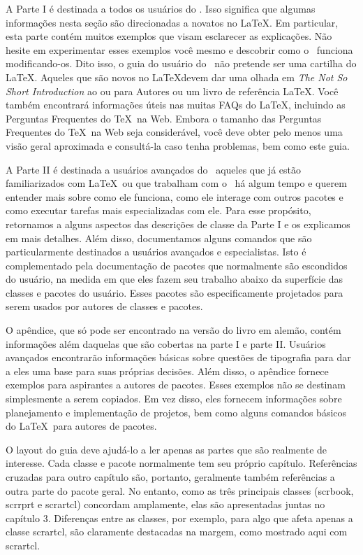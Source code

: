 A Parte I é destinada a todos os usuários do \KOMAScript. Isso significa que algumas informações nesta seção são direcionadas a novatos no \LaTeX. Em particular, esta parte contém muitos exemplos que visam esclarecer as explicações. Não hesite em experimentar esses exemplos você mesmo e descobrir como o \KOMAScript\ funciona modificando-os. Dito isso, o guia do usuário do \KOMAScript\ não pretende ser uma cartilha do \LaTeX. Aqueles que são novos no \LaTeX devem dar uma olhada em \textit{The Not So Short Introduction} ao \LaTeXe ou \LaTeXe para Autores ou um livro de referência \LaTeX. Você também encontrará informações úteis nas muitas FAQs do \LaTeX, incluindo as Perguntas Frequentes do \TeX\ na Web. Embora o tamanho das Perguntas Frequentes do \TeX\ na Web seja considerável, você deve obter pelo menos uma visão geral aproximada e consultá-la caso tenha problemas, bem como este guia.

A Parte II é destinada a usuários avançados do \KOMAScript\, aqueles que já estão familiarizados com \LaTeX\ ou que trabalham com o \KOMAScript\ há algum tempo e querem entender mais sobre como ele funciona, como ele interage com outros pacotes e como executar tarefas mais especializadas com ele. Para esse propósito, retornamos a alguns aspectos das descrições de classe da Parte I e os explicamos em mais detalhes. Além disso, documentamos alguns comandos que são particularmente destinados a usuários avançados e especialistas. Isto é complementado pela documentação de pacotes que normalmente são escondidos do usuário, na medida em que eles fazem seu trabalho abaixo da superfície das classes e pacotes do usuário. Esses pacotes são especificamente projetados para serem usados por autores de classes e pacotes.

O apêndice, que só pode ser encontrado na versão do livro em alemão, contém informações além daquelas que são cobertas na parte I e parte II. Usuários avançados encontrarão informações básicas sobre questões de tipografia para dar a eles uma base para suas próprias decisões. Além disso, o apêndice fornece exemplos para aspirantes a autores de pacotes. Esses exemplos não se destinam simplesmente a serem copiados. Em vez disso, eles fornecem informações sobre planejamento e implementação de projetos, bem como alguns comandos básicos do \LaTeX\ para autores de pacotes.

O layout do guia deve ajudá-lo a ler apenas as partes que são realmente de interesse. Cada classe e pacote normalmente tem seu próprio capítulo. Referências cruzadas para outro capítulo são, portanto, geralmente também referências a outra parte do pacote geral. No entanto, como as três principais classes (scrbook, scrrprt e scrartcl) concordam amplamente, elas são apresentadas juntas no capítulo 3. Diferenças entre as classes, por exemplo, para algo que afeta apenas a classe scrartcl, são claramente destacadas na margem, como mostrado aqui com scrartcl.

